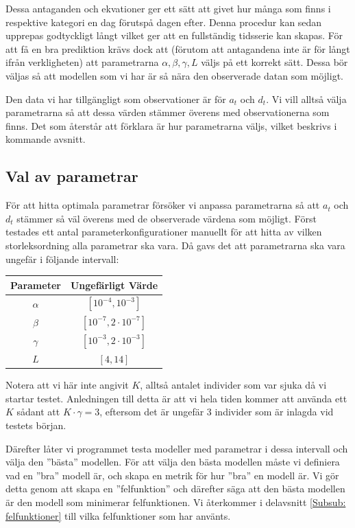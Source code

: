 \documentclass[a4paper, 12pt]{article}
\theoremstyle{definition}
\begin{document}
Dessa antaganden och ekvationer ger ett sätt att givet hur många som finns i respektive kategori en dag förutspå dagen efter. Denna procedur kan sedan upprepas godtyckligt långt vilket ger att en fullständig tidsserie kan skapas. För att få en bra prediktion krävs dock att (förutom att antagandena inte är för långt ifrån verkligheten) att parametrarna $\alpha,\beta,\gamma,L$ väljs på ett korrekt sätt. Dessa bör väljas så att modellen som vi har är så nära den observerade datan som möjligt.

Den data vi har tillgängligt som observationer är för $a_t$ och $d_t$. Vi vill alltså välja parametrarna så att dessa värden stämmer överens med observationerna som finns. Det som återstår att förklara är hur parametrarna väljs, vilket beskrivs i kommande avsnitt.

\subsection{Val av parametrar}
För att hitta optimala parametrar försöker vi anpassa parametrarna så att $a_t$ och $d_t$ stämmer så väl överens med de observerade värdena som möjligt. Först testades ett antal parameterkonfigurationer manuellt för att hitta av vilken storleksordning alla parametrar ska vara. Då gavs det att parametrarna ska vara ungefär i följande intervall:
\begin{center}
  \begin{tabular}{c | c}
    \textbf{Parameter} & \textbf{Ungefärligt Värde} \\ \hline
    $\alpha$ & $[10^{-4},10^{-3}]$ \\ \hline
    $\beta$ & $[10^{-7},2\cdot 10^{-7}]$ \\ \hline
    $\gamma$ & $[10^{-3},2\cdot 10^{-3}]$ \\ \hline
    $L$ & $[4,14]$
  \end{tabular}
\end{center}
Notera att vi här inte angivit $K$, alltså antalet individer som var sjuka då vi startar testet. Anledningen till detta är att vi hela tiden kommer att använda ett $K$ sådant att $K\cdot \gamma=3$, eftersom det är ungefär 3 individer som är inlagda vid testets början.

Därefter låter vi programmet testa modeller med parametrar i dessa intervall och välja den ''bästa'' modellen. För att välja den bästa modellen måste vi definiera vad en ''bra'' modell är, och skapa en metrik för hur ''bra'' en modell är. Vi gör detta genom att skapa en ''felfunktion'' och därefter säga att den bästa modellen är den modell som minimerar felfunktionen. Vi återkommer i delavsnitt \ref{Subsub: felfunktioner} till vilka felfunktioner som har använts.
\end{document}
